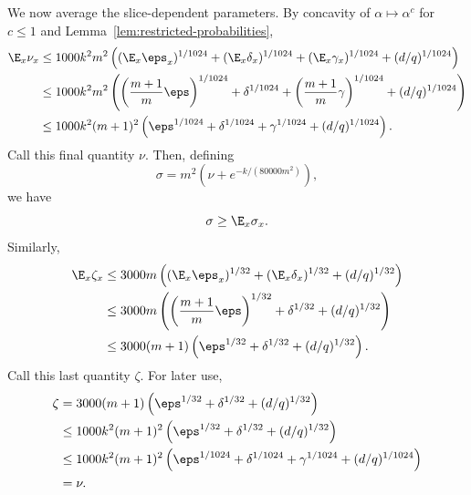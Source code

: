 	We now average the slice-dependent parameters. By concavity of $\alpha \mapsto \alpha^c$ for $c \le 1$ and Lemma~\ref{lem:restricted-probabilities},
	\begin{align*}
		\E_x \nu_x
		 & \le 1000k^2m^2\left((\E_x \eps_x)^{1/1024}+(\E_x \delta_x)^{1/1024}+(\E_x \gamma_x)^{1/1024}+(d/q)^{1/1024}\right)                          \\
		 & \le 1000k^2m^2\left(\left(\frac{m+1}{m}\eps\right)^{1/1024}+\delta^{1/1024}+\left(\frac{m+1}{m}\gamma\right)^{1/1024}+(d/q)^{1/1024}\right) \\
		 & \le 1000k^2(m+1)^2\left(\eps^{1/1024}+\delta^{1/1024}+\gamma^{1/1024}+(d/q)^{1/1024}\right).
	\end{align*}
	Call this final quantity $\nu$. Then, defining
	\[
		\sigma = m^2\left(\nu + e^{-k/(80000m^2)}\right),
	\]
	we have
	\[
		\sigma \ge \E_x \sigma_x.
	\]
	Similarly,
	\begin{align*}
		\E_x \zeta_x
		 & \le 3000m\left((\E_x \eps_x)^{1/32}+(\E_x \delta_x)^{1/32}+(d/q)^{1/32}\right)         \\
		 & \le 3000m\left(\left(\frac{m+1}{m}\eps\right)^{1/32}+\delta^{1/32}+(d/q)^{1/32}\right) \\
		 & \le 3000(m+1)\left(\eps^{1/32}+\delta^{1/32}+(d/q)^{1/32}\right).
	\end{align*}
	Call this last quantity $\zeta$. For later use,
	\begin{align}
		\zeta
		 & = 3000(m+1)\left(\eps^{1/32}+\delta^{1/32}+(d/q)^{1/32}\right) \notag                              \\
		 & \le 1000k^2(m+1)^2\left(\eps^{1/32}+\delta^{1/32}+(d/q)^{1/32}\right) \notag                       \\
		 & \le 1000k^2(m+1)^2\left(\eps^{1/1024}+\delta^{1/1024}+\gamma^{1/1024}+(d/q)^{1/1024}\right) \notag \\
		 & = \nu. \label{eq:zeta-smaller-than-nu}
	\end{align}

